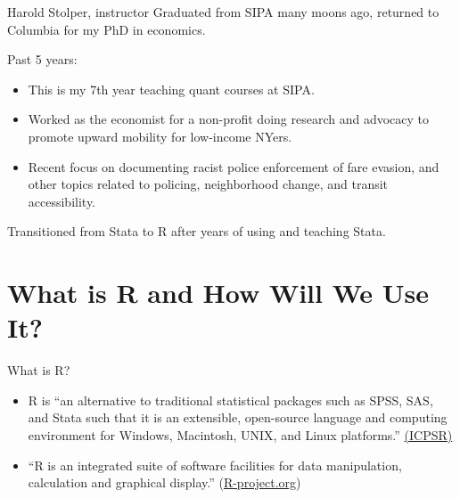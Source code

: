 \documentclass[
  8pt,
  ignorenonframetext,
  dvipsnames]{beamer}
\providecommand{\tightlist}{%
  \setlength{\itemsep}{0pt}\setlength{\parskip}{0pt}}
\let\olditem\item
\renewcommand{\item}{%
  \olditem\vspace{4pt}
}
\begin{document}
\begin{frame}{Harold Stolper, instructor}
\protect\hypertarget{harold-stolper-instructor}{}
Graduated from SIPA many moons ago, returned to Columbia for my PhD in
economics.

\medskip

Past 5 years:

\begin{itemize}
\tightlist
\item
  This is my 7th year teaching quant courses at SIPA.
\item
  Worked as the economist for a non-profit doing research and advocacy
  to promote upward mobility for low-income NYers.
\item
  Recent focus on documenting racist police enforcement of fare evasion,
  and other topics related to policing, neighborhood change, and transit
  accessibility.
\end{itemize}

\medskip

Transitioned from Stata to R after years of using and teaching Stata.
\end{frame}

\hypertarget{what-is-r-and-how-will-we-use-it}{%
\section{What is R and How Will We Use
It?}\label{what-is-r-and-how-will-we-use-it}}

\begin{frame}{What is R?}
\protect\hypertarget{what-is-r}{}
\begin{itemize}
\tightlist
\item
  R is ``an alternative to traditional statistical packages such as
  SPSS, SAS, and Stata such that it is an extensible, open-source
  language and computing environment for Windows, Macintosh, UNIX, and
  Linux platforms.''
  \href{https://www.icpsr.umich.edu/icpsrweb/content/shared/ICPSR/faqs/what-is-r.html}{(ICPSR)}
\end{itemize}

\medskip

\begin{itemize}
\tightlist
\item
  ``R is an integrated suite of software facilities for data
  manipulation, calculation and graphical display.''
  (\href{https://www.r-project.org/about.html}{R-project.org})
\end{itemize}
\end{frame}
\end{document}

